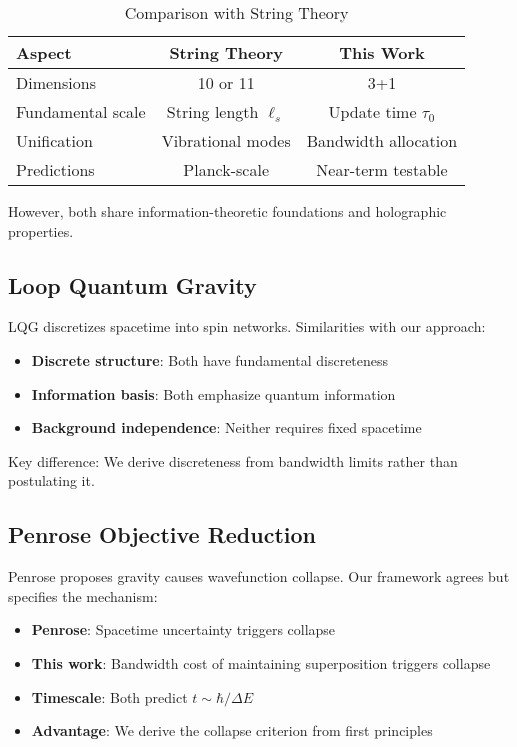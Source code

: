 \documentclass[twocolumn,prd,amsmath,amssymb,aps,superscriptaddress,nofootinbib]{revtex4-2}
\begin{document}
\begin{table}[h]
\caption{Comparison with String Theory}
\label{tab:string_comparison}
\begin{ruledtabular}
\begin{tabular}{lcc}
Aspect & String Theory & This Work \\
\hline
Dimensions & 10 or 11 & 3+1 \\
Fundamental scale & String length $\ell_s$ & Update time $\tau_0$ \\
Unification & Vibrational modes & Bandwidth allocation \\
Predictions & Planck-scale & Near-term testable \\
\end{tabular}
\end{ruledtabular}
\end{table}

However, both share information-theoretic foundations and holographic properties.

\subsection{Loop Quantum Gravity}

LQG discretizes spacetime into spin networks. Similarities with our approach:
\begin{itemize}
\item \textbf{Discrete structure}: Both have fundamental discreteness
\item \textbf{Information basis}: Both emphasize quantum information
\item \textbf{Background independence}: Neither requires fixed spacetime
\end{itemize}

Key difference: We derive discreteness from bandwidth limits rather than postulating it.

\subsection{Penrose Objective Reduction}

Penrose proposes gravity causes wavefunction collapse. Our framework agrees but specifies the mechanism:
\begin{itemize}
\item \textbf{Penrose}: Spacetime uncertainty triggers collapse
\item \textbf{This work}: Bandwidth cost of maintaining superposition triggers collapse
\item \textbf{Timescale}: Both predict $t \sim \hbar/\Delta E$
\item \textbf{Advantage}: We derive the collapse criterion from first principles
\end{itemize}
\end{document}
